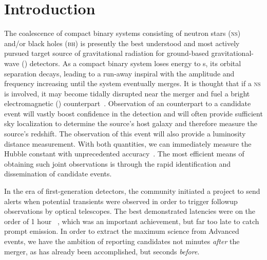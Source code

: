 \section{Introduction}
\label{sec:introduction}


The coalescence of compact binary systems consisting of neutron stars
 (\textsc{ns}) and/or black holes (\textsc{bh}) is presently the best
understood and most actively pursued target source of gravitational
radiation for ground-based gravitational-wave (\GW{}) detectors.
As a compact binary system loses energy to \GW{}s, its
orbital separation decays, leading to a run-away inspiral with the \GW{}
amplitude and frequency increasing until the system eventually merges.  It is
thought that if a \textsc{ns} is involved, it may become tidally disrupted near
the merger and fuel a bright electromagnetic (\EM{})
counterpart~\cite{shibata:2007}. Observation of an \EM{} counterpart to a
candidate \GW{} event will vastly boost confidence in the \GW{} detection and
will often provide sufficient sky localization to determine
the source's host galaxy and therefore measure the source's redshift. The
\GW{} observation of this event will also provide a luminosity
distance measurement. With both quantities, we can
immediately measure the Hubble constant with unprecedented
accuracy~\cite{2010ApJ...725..496N}. The most efficient means of obtaining
such joint observations is through the rapid identification and dissemination
of candidate \GW{} events.

In the era of first-generation detectors, the \GW{} community initiated a
project to send alerts when potential \GW{} transients were observed in
order to trigger followup observations by optical telescopes.  The best
demonstrated latencies were on the order of 1 hour%
~\cite{HugheyGWPAW2011}, which was an important
achievement, but far too late to catch prompt \EM{}
emission. In order to extract the maximum science from Advanced \LIGO{}
\CBC{} events, we have the ambition of reporting \GW{} candidates not minutes
\emph{after} the merger, as has already been accomplished, but seconds
\emph{before}.

